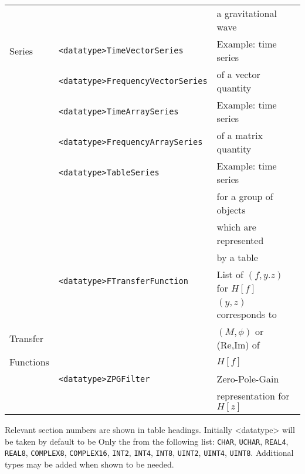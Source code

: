 \documentclass[]{ligodcc}
\renewcommand{\texttt}[1]{{\ttfamily\color{blue}#1}}
\begin{document}
\begin{table}
\begin{center}
\begin{tabular}{|l|l|l|}
           &                                           & a gravitational wave    \\ \cline{2-3}           
Series     & {\tt <datatype>TimeVectorSeries}          & Example: time series    \\            
           & {\tt <datatype>FrequencyVectorSeries}     & of a vector quantity    \\ \cline{2-3}
           & {\tt <datatype>TimeArraySeries}           & Example: time series    \\            
           & {\tt <datatype>FrequencyArraySeries}      & of a matrix quantity    \\ \cline{2-3}
           & {\tt <datatype>TableSeries}               & Example: time series    \\            
           &                                           & for a group of objects  \\            
           &                                           & which are represented   \\            
           &                                           & by a table              \\            
\hline
           & {\tt <datatype>FTransferFunction}  & List of $(f,y.z)$ for $H[f]$  \\ 
           &                                    & $(y,z)$ corresponds to        \\
Transfer   &                                    & $(M,\phi)$ or (Re,Im) of      \\
Functions  &                                    & $H[f]$                        \\ \cline{2-3} 
           & {\tt <datatype>ZPGFilter}          & Zero-Pole-Gain                \\ 
           &                                    & representation for $H[z]$     \\  
\hline
\end{tabular}
\end{center}

Relevant section numbers are shown in table
headings. Initially {\texttt {<datatype>}} will be taken by default to be Only
the from the following list: {\tt CHAR}, {\tt UCHAR}, {\tt REAL4},
{\tt REAL8}, {\tt COMPLEX8}, {\tt COMPLEX16}, {\tt INT2}, {\tt INT4}, {\tt INT8}, 
{\tt UINT2}, {\tt  UINT4}, {\tt UINT8}. Additional types may be added
when shown to be needed.
\label{laldataobjects}
\end{table}
\end{document}
